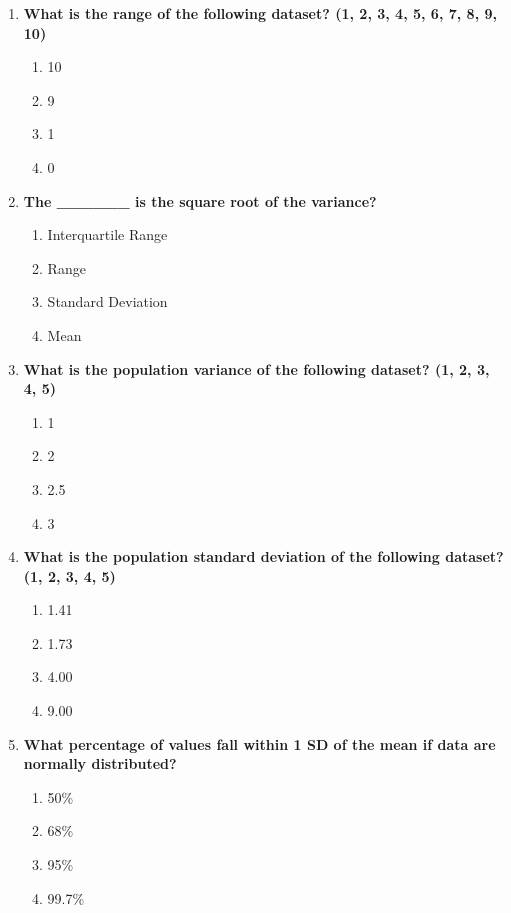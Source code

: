 \documentclass[
  letterpaper,
  DIV=11,
  numbers=noendperiod]{scrreprt}
\begin{document}
\begin{enumerate}
\def\labelenumi{\arabic{enumi}.}
\item
  \textbf{What is the range of the following dataset? (1, 2, 3, 4, 5, 6,
  7, 8, 9, 10)}

  \begin{enumerate}
  \def\labelenumii{\alph{enumii}.}
  \item
    10
  \item
    9
  \item
    1
  \item
    0
  \end{enumerate}
\item
  \textbf{The \_\_\_\_\_\_ is the square root of the variance?}

  \begin{enumerate}
  \def\labelenumii{\alph{enumii}.}
  \item
    Interquartile Range
  \item
    Range
  \item
    Standard Deviation
  \item
    Mean
  \end{enumerate}
\item
  \textbf{What is the population variance of the following dataset? (1,
  2, 3, 4, 5)}

  \begin{enumerate}
  \def\labelenumii{\alph{enumii}.}
  \item
    1
  \item
    2
  \item
    2.5
  \item
    3
  \end{enumerate}
\item
  \textbf{What is the population standard deviation of the following
  dataset? (1, 2, 3, 4, 5)}

  \begin{enumerate}
  \def\labelenumii{\alph{enumii}.}
  \item
    1.41
  \item
    1.73
  \item
    4.00
  \item
    9.00
  \end{enumerate}
\item
  \textbf{What percentage of values fall within 1 SD of the mean if data
  are normally distributed?}

  \begin{enumerate}
  \def\labelenumii{\alph{enumii}.}
  \item
    50\%
  \item
    68\%
  \item
    95\%
  \item
    99.7\%
  \end{enumerate}
\end{enumerate}
\end{document}
